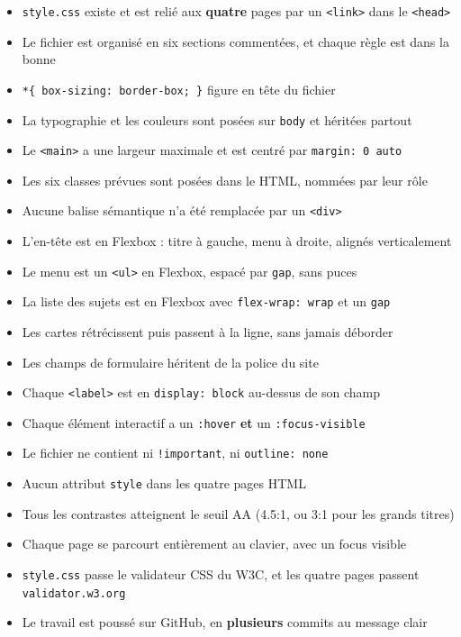 \documentclass[a4paper,11pt]{article}
\begin{document}
\begin{tcolorbox}[definition, title={Auto-évaluation}]
\begin{itemize}
  \item[$\square$] \texttt{style.css} existe et est relié aux \textbf{quatre} pages par un \texttt{<link>} dans le \texttt{<head>}
  \item[$\square$] Le fichier est organisé en six sections commentées, et chaque règle est dans la bonne
  \item[$\square$] \texttt{*\{ box-sizing: border-box; \}} figure en tête du fichier
  \item[$\square$] La typographie et les couleurs sont posées sur \texttt{body} et héritées partout
  \item[$\square$] Le \texttt{<main>} a une largeur maximale et est centré par \texttt{margin: 0 auto}
  \item[$\square$] Les six classes prévues sont posées dans le HTML, nommées par leur rôle
  \item[$\square$] Aucune balise sémantique n'a été remplacée par un \texttt{<div>}
  \item[$\square$] L'en-tête est en Flexbox : titre à gauche, menu à droite, alignés verticalement
  \item[$\square$] Le menu est un \texttt{<ul>} en Flexbox, espacé par \texttt{gap}, sans puces
  \item[$\square$] La liste des sujets est en Flexbox avec \texttt{flex-wrap: wrap} et un \texttt{gap}
  \item[$\square$] Les cartes rétrécissent puis passent à la ligne, sans jamais déborder
  \item[$\square$] Les champs de formulaire héritent de la police du site
  \item[$\square$] Chaque \texttt{<label>} est en \texttt{display: block} au-dessus de son champ
  \item[$\square$] Chaque élément interactif a un \texttt{:hover} \textbf{et} un \texttt{:focus-visible}
  \item[$\square$] Le fichier ne contient ni \texttt{!important}, ni \texttt{outline: none}
  \item[$\square$] Aucun attribut \texttt{style} dans les quatre pages HTML
  \item[$\square$] Tous les contrastes atteignent le seuil AA (4.5:1, ou 3:1 pour les grands titres)
  \item[$\square$] Chaque page se parcourt entièrement au clavier, avec un focus visible
  \item[$\square$] \texttt{style.css} passe le validateur CSS du W3C, et les quatre pages passent \texttt{validator.w3.org}
  \item[$\square$] Le travail est poussé sur GitHub, en \textbf{plusieurs} commits au message clair
\end{itemize}
\end{tcolorbox}
\end{document}
